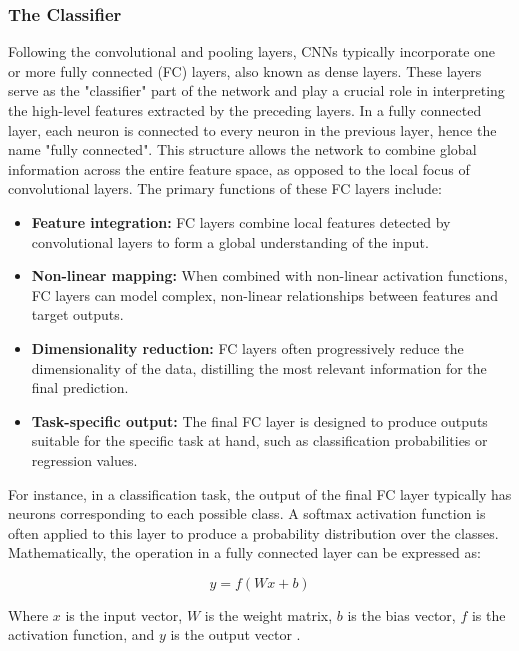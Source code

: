 \subsubsection{The Classifier}
Following the convolutional and pooling layers, CNNs typically incorporate one or more fully connected (FC) layers, also known as dense layers. These layers serve as the "classifier" part of the network and play a crucial role in interpreting the high-level features extracted by the preceding layers.
In a fully connected layer, each neuron is connected to every neuron in the previous layer, hence the name "fully connected". This structure allows the network to combine global information across the entire feature space, as opposed to the local focus of convolutional layers.
The primary functions of these FC layers include:
\begin{itemize}
\item \textbf{Feature integration:} FC layers combine local features detected by convolutional layers to form a global understanding of the input.
\item \textbf{Non-linear mapping:} When combined with non-linear activation functions, FC layers can model complex, non-linear relationships between features and target outputs.
\item \textbf{Dimensionality reduction:} FC layers often progressively reduce the dimensionality of the data, distilling the most relevant information for the final prediction.
\item \textbf{Task-specific output:} The final FC layer is designed to produce outputs suitable for the specific task at hand, such as classification probabilities or regression values.
\end{itemize}
For instance, in a classification task, the output of the final FC layer typically has neurons corresponding to each possible class. A softmax activation function is often applied to this layer to produce a probability distribution over the classes.
Mathematically, the operation in a fully connected layer can be expressed as:

\[
y = f(Wx + b)
\]

Where $x$ is the input vector, $W$ is the weight matrix, $b$ is the bias vector, $f$ is the activation function, and $y$ is the output vector \cite{Klein}.

